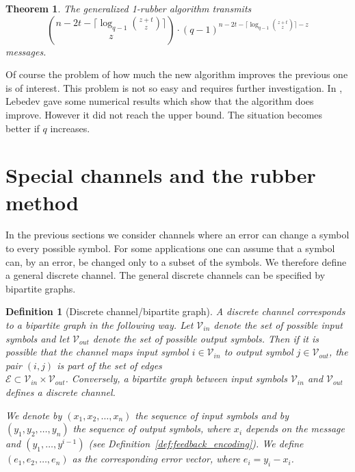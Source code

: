 \documentclass[conference]{IEEEtran}
\newtheorem{Theorem}{Theorem}
\newtheorem{Definition}{Definition}
\begin{document}

\begin{Theorem} The generalized 1-rubber algorithm transmits
$$ \binom{n-2t-\lceil \log_{q-1}\binom{z+t}{z} \rceil}{z}\cdot (q-1)^{n-2t-\lceil \log_{q-1}\binom{z+t}{z} \rceil -z}$$
messages.
\end{Theorem}

Of course the problem of how much the new algorithm improves the previous one is of interest. This problem is not so easy and requires further investigation. In \cite{L16}, Lebedev gave some numerical results which show that the algorithm does improve. However it did not reach the upper bound. The situation
becomes better if $q$ increases.


\section{Special channels and the rubber method}


In the previous sections we consider channels where an error
can change a symbol to every possible symbol. For some applications
one can assume that a symbol can, by an error, be changed only to a subset 
of the symbols. We therefore define a general discrete channel.
The general discrete channels can be specified by bipartite graphs.

\begin{Definition}[Discrete channel/bipartite graph]
	A discrete channel corresponds to a bipartite graph in the following way. Let $\mathcal{V}_{in}$ denote the set of possible input symbols and let $\mathcal{V}_{out}$ denote the set of possible output symbols. Then if it is possible that the channel maps input symbol $i \in \mathcal{V}_{in}$ to output symbol $j \in \mathcal{V}_{out}$, the pair $(i,j)$ is part of the set of edges \\ $\mathcal{E} \subset \mathcal{V}_{in} \times \mathcal{V}_{out}$. Conversely, a bipartite graph between input symbols $\mathcal{V}_{in}$ and $\mathcal{V}_{out}$ defines a discrete channel.
	
		We denote by $(x_1,x_2,\dots,x_n)$ the sequence of input symbols and by $(y_1,y_2,\dots, y_n)$ the sequence of output symbols, where $x_i$ depends
	on the message and $(y_1,\dots,y^{i-1})$ (see Definition~\ref{def:feedback_encoding}).
	We define $(e_1,e_2,\dots, e_n)$ as the corresponding error vector, where $e_i=y_i-x_i$.
\end{Definition}
\end{document}
